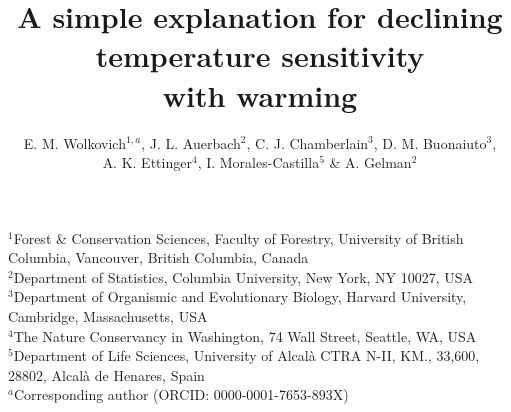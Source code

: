 \documentclass[11pt,letter]{article}
\begin{document}
\title{A simple explanation for declining temperature sensitivity \\ with warming} %
\author{E. M. Wolkovich$^{1,a}$,  J. L. Auerbach$^{2}$, C. J. Chamberlain$^{3}$, D. M. Buonaiuto$^{3}$, \\ A. K. Ettinger$^4$, I. Morales-Castilla$^{5}$ \& A. Gelman$^{2}$} 
\date{} %
\maketitle
$^1$Forest \& Conservation Sciences, Faculty of Forestry, University of British Columbia, Vancouver, British Columbia, Canada\\
$^2$Department of Statistics, Columbia University, New York, NY 10027, USA\\
$^3$Department of Organismic and Evolutionary Biology, Harvard University, Cambridge, Massachusetts, USA\\
$^4$The Nature Conservancy in Washington, 74 Wall Street, Seattle, WA, USA\\
$^5$Department of Life Sciences, University of Alcal\`a CTRA N-II, KM., 33,600, 28802, Alcal\`a de Henares, Spain\\
$^a$Corresponding author (ORCID: 0000-0001-7653-893X)
\vspace{3ex}

\end{document}
